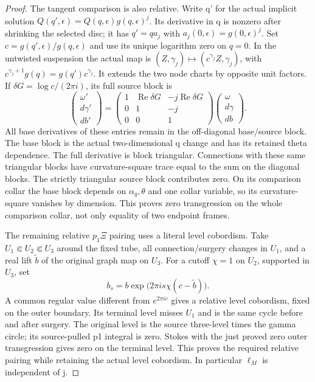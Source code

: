 \begin{proof}
The tangent comparison is also relative.  Write q' for the actual
implicit solution \(Q(q',\epsilon)=Q(q,\epsilon)g(q,\epsilon)^j\).
Its derivative in q is nonzero after shrinking the selected disc;
it has \(q'=q a_j\) with \(a_j(0,\epsilon)=g(0,\epsilon)^j\).
Set \(c=g(q',\epsilon)/g(q,\epsilon)\) and use its unique
logarithm zero on \(q=0\).  In the untwisted suspension the actual map is
\((Z,\gamma_j)\mapsto(c^{\gamma_j}Z,\gamma_j)\), with
\(c^{\gamma_j+1}g(q)=g(q')c^{\gamma_j}\).  It extends the two
node charts by opposite unit factors.  If
\(\delta G=\log c/(2\pi i)\), its full source block is
\[
 \begin{pmatrix}\omega'\\d\gamma'\\db'\end{pmatrix}
 =\begin{pmatrix}1&\operatorname{Re}\delta G&-j\operatorname{Re}\delta G\\
                 0&1&-j\\0&0&1\end{pmatrix}
   \begin{pmatrix}\omega\\d\gamma\\db\end{pmatrix}.
 \tag{IF.14a}
\]
All base derivatives of these entries remain in the off-diagonal
base/source block.  The base
block is the actual two-dimensional q change and has its retained
theta dependence.  The full derivative is block triangular.
Connections with these same triangular blocks have curvature-square
trace equal to the sum on the diagonal blocks.  The strictly
triangular source block contributes zero.  On its comparison collar
the base block depends on \(\alpha_q,\theta\) and one collar
variable, so its curvature-square vanishes by dimension.  This proves
zero transgression on the whole comparison collar, not only equality
of two endpoint frames.

The remaining relative \(p_1\Xi\) pairing uses a literal level
cobordism.  Take \(U_1\Subset U_2\Subset U_3\) around the fixed
tube, all connection/surgery changes in \(U_1\), and a real lift
\(\widetilde b\) of the original graph map on \(U_3\).  For a cutoff
\(\chi=1\) on \(U_2\), supported in \(U_3\), set
\[
 b_s=b\exp\bigl(2\pi i s\chi(c-\widetilde b)\bigr).
 \tag{IF.14}
\]
A common regular value different from \(e^{2\pi i c}\) gives a
relative level cobordism, fixed on the outer boundary.  Its terminal
level misses \(U_1\) and is the same cycle before and after surgery.  The
original level is the source three-level times the gamma circle; its
source-pulled p1 integral is zero.  Stokes with the just proved zero
outer transgression gives zero on the terminal level.  This proves
the required relative pairing while retaining the actual level
cobordism.  In particular \(\ell_M\) is independent of j.


\end{proof}
